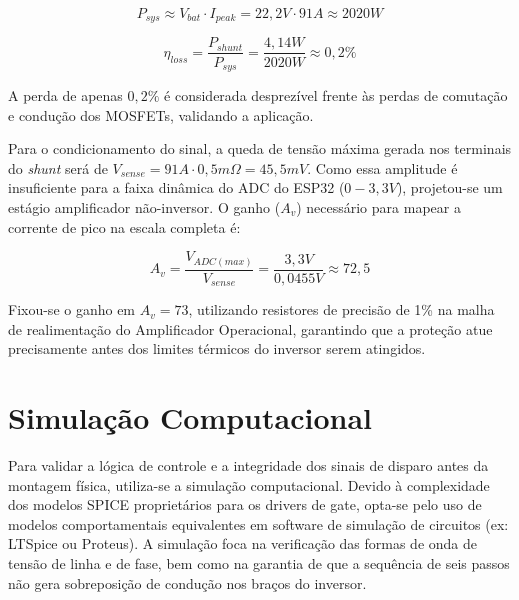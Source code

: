 \begin{equation}
    P_{sys} \approx V_{bat} \cdot I_{peak} = 22,2V \cdot 91A \approx 2020 W
\end{equation}

\begin{equation}
    \eta_{loss} = \frac{P_{shunt}}{P_{sys}} = \frac{4,14W}{2020W} \approx 0,2\%
\end{equation}

A perda de apenas $0,2\%$ é considerada desprezível frente às perdas de comutação e condução dos MOSFETs, validando a aplicação.

Para o condicionamento do sinal, a queda de tensão máxima gerada nos terminais do \textit{shunt} será de $V_{sense} = 91A \cdot 0,5m\Omega = 45,5mV$. Como essa amplitude é insuficiente para a faixa dinâmica do ADC do ESP32 ($0-3,3V$), projetou-se um estágio amplificador não-inversor. O ganho ($A_v$) necessário para mapear a corrente de pico na escala completa é:

\begin{equation}
    A_v = \frac{V_{ADC(max)}}{V_{sense}} = \frac{3,3V}{0,0455V} \approx 72,5
\end{equation}

Fixou-se o ganho em $A_v = 73$, utilizando resistores de precisão de 1\% na malha de realimentação do Amplificador Operacional, garantindo que a proteção atue precisamente antes dos limites térmicos do inversor serem atingidos.

\section{Simulação Computacional}
Para validar a lógica de controle e a integridade dos sinais de disparo antes da montagem física, utiliza-se a simulação computacional. Devido à complexidade dos modelos SPICE proprietários para os drivers de gate, opta-se pelo uso de modelos comportamentais equivalentes em software de simulação de circuitos (ex: LTSpice ou Proteus). A simulação foca na verificação das formas de onda de tensão de linha e de fase, bem como na garantia de que a sequência de seis passos não gera sobreposição de condução nos braços do inversor.

